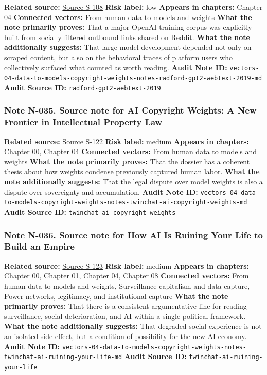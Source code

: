 \documentclass[
  american,
  11pt,
  letterpaper,
]{article}
\begin{document}
\textbf{Related source:}
\hyperref[source-s-108-language-models-are-unsupervised-multitask-learners]{Source
S-108} \textbf{Risk label:} low \textbf{Appears in chapters:} Chapter 04
\textbf{Connected vectors:} From human data to models and weights
\textbf{What the note primarily proves:} That a major OpenAI training
corpus was explicitly built from socially filtered outbound links shared
on Reddit. \textbf{What the note additionally suggests:} That
large-model development depended not only on scraped content, but also
on the behavioral traces of platform users who collectively surfaced
what counted as worth reading. \textbf{Audit Note ID:}
\texttt{vectors-04-data-to-models-copyright-weights-notes-radford-gpt2-webtext-2019-md}
\textbf{Audit Source ID:} \texttt{radford-gpt2-webtext-2019}

\subsubsection{Note N-035. Source note for AI Copyright Weights: A New
Frontier in Intellectual Property
Law}\label{note-n-035-vectors-04-data-to-models-copyright-weights-notes-twinchat-ai-copyright-weights-md}

\textbf{Related source:}
\hyperref[source-s-122-ai-copyright-weights-a-new-frontier-in-intellectual-property-law]{Source
S-122} \textbf{Risk label:} medium \textbf{Appears in chapters:} Chapter
00, Chapter 04 \textbf{Connected vectors:} From human data to models and
weights \textbf{What the note primarily proves:} That the dossier has a
coherent thesis about how weights condense previously captured human
labor. \textbf{What the note additionally suggests:} That the legal
dispute over model weights is also a dispute over sovereignty and
accumulation. \textbf{Audit Note ID:}
\texttt{vectors-04-data-to-models-copyright-weights-notes-twinchat-ai-copyright-weights-md}
\textbf{Audit Source ID:} \texttt{twinchat-ai-copyright-weights}

\subsubsection{Note N-036. Source note for How AI Is Ruining Your Life
to Build an
Empire}\label{note-n-036-vectors-04-data-to-models-copyright-weights-notes-twinchat-ai-ruining-your-life-md}

\textbf{Related source:}
\hyperref[source-s-123-how-ai-is-ruining-your-life-to-build-an-empire]{Source
S-123} \textbf{Risk label:} medium \textbf{Appears in chapters:} Chapter
00, Chapter 01, Chapter 04, Chapter 08 \textbf{Connected vectors:} From
human data to models and weights, Surveillance capitalism and data
capture, Power networks, legitimacy, and institutional capture
\textbf{What the note primarily proves:} That there is a consistent
argumentative line for reading surveillance, social deterioration, and
AI within a single political framework. \textbf{What the note
additionally suggests:} That degraded social experience is not an
isolated side effect, but a condition of possibility for the new AI
economy. \textbf{Audit Note ID:}
\texttt{vectors-04-data-to-models-copyright-weights-notes-twinchat-ai-ruining-your-life-md}
\textbf{Audit Source ID:} \texttt{twinchat-ai-ruining-your-life}
\end{document}
